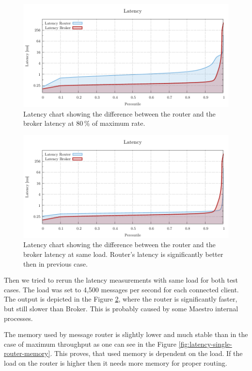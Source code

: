 \begin{figure}[H]
	\centering
	\includegraphics[width=1\linewidth]{obrazky-figures/charts/singlepoint-latency.pdf}
	\caption{Latency chart showing the difference between the router and the broker latency at 80\,\% of maximum rate.}
	\label{fig:latency-single-router}
\end{figure}

\begin{figure}[H]
	\centering
	\includegraphics[width=1\linewidth]{obrazky-figures/charts/singlepoint-latency-18k.pdf}
	\caption{Latency chart showing the difference between the router and the broker latency at same load. Router's latency is significantly better then in previous case.}
	\label{fig:latency-single-same-load}
\end{figure}

Then we tried to rerun the latency measurements with same load for both test cases. The load was set to 4,500 messages per second for each connected client. The output is depicted in the Figure \ref{fig:latency-single-same-load}, where the router is significantly faster, but still slower than Broker. This is probably caused by some Maestro internal processes.

The memory used by message router is slightly lower and much stable than in the case of maximum throughput as one can see in the Figure \ref{fig:latency-single-router-memory}. This proves, that used memory is dependent on the load. If the load on the router is higher then it needs more memory for proper routing.


